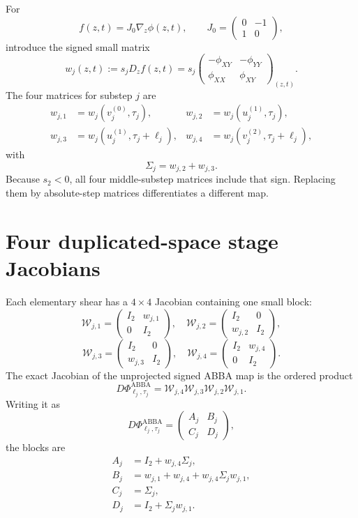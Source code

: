 \documentclass[11pt,a4paper]{article}
\newcommand{\Id}{I}
\begin{document}
For
\[
 f(z,t)=J_0\nabla_z\phi(z,t),
 \qquad
 J_0=\begin{pmatrix}0&-1\\1&0\end{pmatrix},
\]
introduce the signed small matrix
\[
 \boxed{
 w_j(z,t):=s_jD_zf(z,t)
 =s_j\begin{pmatrix}
 -\phi_{XY}&-\phi_{YY}\\
 \phi_{XX}&\phi_{XY}
 \end{pmatrix}_{(z,t)}.
 }
\]
The four matrices for substep $j$ are
\begin{align*}
 w_{j,1}&=w_j(v_j^{(0)},\tau_j),&
 w_{j,2}&=w_j(u_j^{(1)},\tau_j),\\
 w_{j,3}&=w_j(u_j^{(1)},\tau_j+\ell_j),&
 w_{j,4}&=w_j(v_j^{(2)},\tau_j+\ell_j),
\end{align*}
with
\[
 \Sigma_j=w_{j,2}+w_{j,3}.
\]
Because $s_2<0$, all four middle-substep matrices include that sign.  Replacing
them by absolute-step matrices differentiates a different map.

\section{Four duplicated-space stage Jacobians}

Each elementary shear has a $4\times4$ Jacobian containing one small block:
\[
 \boxed{
 \mathcal W_{j,1}=\begin{pmatrix}\Id_2&w_{j,1}\\0&\Id_2\end{pmatrix},
 \quad
 \mathcal W_{j,2}=\begin{pmatrix}\Id_2&0\\w_{j,2}&\Id_2\end{pmatrix},
 }
\]
\[
 \boxed{
 \mathcal W_{j,3}=\begin{pmatrix}\Id_2&0\\w_{j,3}&\Id_2\end{pmatrix},
 \quad
 \mathcal W_{j,4}=\begin{pmatrix}\Id_2&w_{j,4}\\0&\Id_2\end{pmatrix}.
 }
\]
The exact Jacobian of the unprojected signed ABBA map is the ordered product
\[
 \boxed{
 D\Phi^{\mathrm{ABBA}}_{\ell_j,\tau_j}
 =\mathcal W_{j,4}\mathcal W_{j,3}
  \mathcal W_{j,2}\mathcal W_{j,1}.
 }
\]
Writing it as
\[
 D\Phi^{\mathrm{ABBA}}_{\ell_j,\tau_j}
 =\begin{pmatrix}A_j&B_j\\C_j&D_j\end{pmatrix},
\]
the blocks are
\begin{align*}
 A_j&=\Id_2+w_{j,4}\Sigma_j,\\
 B_j&=w_{j,1}+w_{j,4}+w_{j,4}\Sigma_jw_{j,1},\\
 C_j&=\Sigma_j,\\
 D_j&=\Id_2+\Sigma_jw_{j,1}.
\end{align*}
\end{document}
